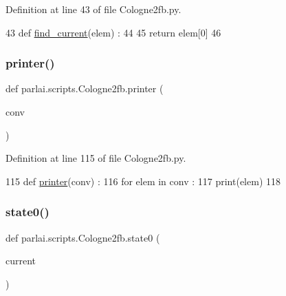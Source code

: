 Definition at line 43 of file Cologne2fb.\+py.


\begin{DoxyCode}
43 \textcolor{keyword}{def }\hyperlink{namespaceparlai_1_1scripts_1_1Cologne2fb_a0769ed4e08e090e651516d1c4dd50b39}{find\_current}(elem) :
44 
45     \textcolor{keywordflow}{return} elem[0]
46 
\end{DoxyCode}
\mbox{\label{namespaceparlai_1_1scripts_1_1Cologne2fb_aada34019571fe1ff9ae0a5fc8bf03c67}} 
\subsubsection{\texorpdfstring{printer()}{printer()}}
{\footnotesize\ttfamily def parlai.\+scripts.\+Cologne2fb.\+printer (\begin{DoxyParamCaption}\item[{}]{conv }\end{DoxyParamCaption})}



Definition at line 115 of file Cologne2fb.\+py.


\begin{DoxyCode}
115 \textcolor{keyword}{def }\hyperlink{namespaceparlai_1_1scripts_1_1Cologne2fb_aada34019571fe1ff9ae0a5fc8bf03c67}{printer}(conv) : 
116     \textcolor{keywordflow}{for} elem \textcolor{keywordflow}{in} conv : 
117         print(elem)
118 
\end{DoxyCode}
\mbox{\label{namespaceparlai_1_1scripts_1_1Cologne2fb_ac765067cc58a95632761e7cf25d552ca}} 
\subsubsection{\texorpdfstring{state0()}{state0()}}
{\footnotesize\ttfamily def parlai.\+scripts.\+Cologne2fb.\+state0 (\begin{DoxyParamCaption}\item[{}]{current }\end{DoxyParamCaption})}



